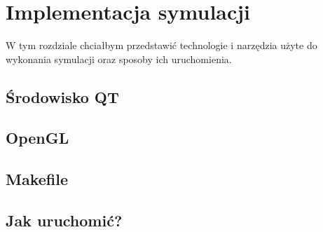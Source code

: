 \chapter{Implementacja symulacji}
\label{cha:implementacja}

W tym rozdziale chciałbym przedstawić technologie i narzędzia użyte do wykonania symulacji oraz sposoby ich uruchomienia.


\section{Środowisko QT}
\label{sec:qt}

\section{OpenGL}
\label{sec:opengl}

\section{Makefile}
\label{sec::makefile}

\section{Jak uruchomić?}
\label{sec::uruchomic}

